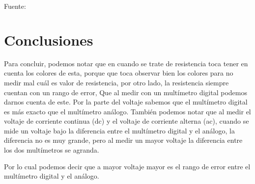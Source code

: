 \documentclass[letterpaper, 12pt]{report}
\begin{document}
Fuente:~\cite{CesarCinjordiz}

\section{Conclusiones}

Para concluir, podemos notar que en cuando se trate de resistencia toca
tener en cuenta los colores de esta, porque que toca observar bien los colores
para no medir mal cuál es valor de resistencia, por otro lado, la resistencia
siempre cuentan con un rango de error, Que al medir con un multímetro digital
podemos darnos cuenta de este. Por la parte del voltaje sabemos que el
multímetro digital es más exacto que el multímetro análogo. También podemos
notar que al medir el voltaje de corriente continua (dc) y el voltaje de
corriente alterna (ac), cuando se mide un voltaje bajo la diferencia entre
el multímetro digital y el análogo, la diferencia no es muy grande, pero al
medir un mayor voltaje la diferencia entre los dos multímetros se agranda.

\vspace{.5cm}

Por lo cual podemos decir que a mayor voltaje mayor es el rango de error
entre el multímetro digital y el análogo.

\newpage


\end{document}
